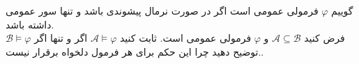 گوییم 
$\varphi$
فرمولی عمومی است اگر در صورت نرمال پیشوندی باشد و تنها سور عمومی داشته باشد. 
\\
فرض کنید
$\mathcal{A}\subseteq\mathcal{B}$
و
$\varphi$
فرمولی عمومی است. ثابت کنید 
$\mathcal{A}\models\varphi$
اگر و تنها اگر 
$\mathcal{B}\models\varphi$
.توضیح دهید چرا این حکم برای هر فرمول دلخواه برقرار نیست.
